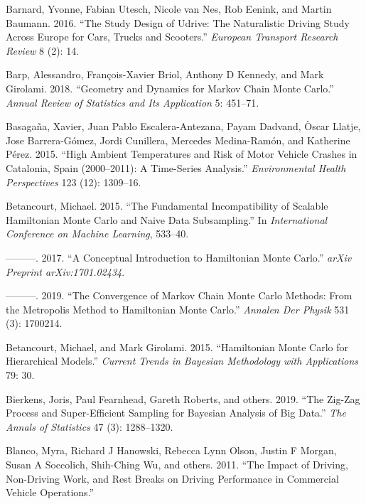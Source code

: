 \documentclass[12pt]{book}
\numberwithin{equation}{chapter}
\begin{document}
\leavevmode\hypertarget{ref-barnard2016study}{}%
Barnard, Yvonne, Fabian Utesch, Nicole van Nes, Rob Eenink, and Martin Baumann. 2016. ``The Study Design of Udrive: The Naturalistic Driving Study Across Europe for Cars, Trucks and Scooters.'' \emph{European Transport Research Review} 8 (2): 14.

\leavevmode\hypertarget{ref-barp2018geometry}{}%
Barp, Alessandro, François-Xavier Briol, Anthony D Kennedy, and Mark Girolami. 2018. ``Geometry and Dynamics for Markov Chain Monte Carlo.'' \emph{Annual Review of Statistics and Its Application} 5: 451--71.

\leavevmode\hypertarget{ref-basagana2015high}{}%
Basagaña, Xavier, Juan Pablo Escalera-Antezana, Payam Dadvand, Òscar Llatje, Jose Barrera-Gómez, Jordi Cunillera, Mercedes Medina-Ramón, and Katherine Pérez. 2015. ``High Ambient Temperatures and Risk of Motor Vehicle Crashes in Catalonia, Spain (2000--2011): A Time-Series Analysis.'' \emph{Environmental Health Perspectives} 123 (12): 1309--16.

\leavevmode\hypertarget{ref-betancourt2015fundamental}{}%
Betancourt, Michael. 2015. ``The Fundamental Incompatibility of Scalable Hamiltonian Monte Carlo and Naive Data Subsampling.'' In \emph{International Conference on Machine Learning}, 533--40.

\leavevmode\hypertarget{ref-betancourt2017conceptual}{}%
---------. 2017. ``A Conceptual Introduction to Hamiltonian Monte Carlo.'' \emph{arXiv Preprint arXiv:1701.02434}.

\leavevmode\hypertarget{ref-betancourt2019convergence}{}%
---------. 2019. ``The Convergence of Markov Chain Monte Carlo Methods: From the Metropolis Method to Hamiltonian Monte Carlo.'' \emph{Annalen Der Physik} 531 (3): 1700214.

\leavevmode\hypertarget{ref-betancourt2015hamiltonian}{}%
Betancourt, Michael, and Mark Girolami. 2015. ``Hamiltonian Monte Carlo for Hierarchical Models.'' \emph{Current Trends in Bayesian Methodology with Applications} 79: 30.

\leavevmode\hypertarget{ref-bierkens2019zig}{}%
Bierkens, Joris, Paul Fearnhead, Gareth Roberts, and others. 2019. ``The Zig-Zag Process and Super-Efficient Sampling for Bayesian Analysis of Big Data.'' \emph{The Annals of Statistics} 47 (3): 1288--1320.

\leavevmode\hypertarget{ref-blanco2011impact}{}%
Blanco, Myra, Richard J Hanowski, Rebecca Lynn Olson, Justin F Morgan, Susan A Soccolich, Shih-Ching Wu, and others. 2011. ``The Impact of Driving, Non-Driving Work, and Rest Breaks on Driving Performance in Commercial Vehicle Operations.''
\end{document}
